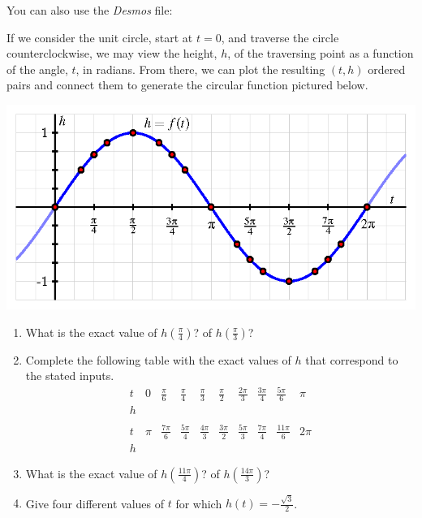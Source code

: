 \documentclass[nooutcomes]{ximera}
\begin{document}
You can also use the \emph{Desmos} file:

\begin{center}  
\end{center}

\begin{exploration}

If we consider the unit circle, start at \(t = 0\), and traverse the circle counterclockwise, we may view the height, \(h\), of the traversing point as a function of the angle, \(t\), in radians.  From there, we can plot the resulting \((t,h)\) ordered pairs and connect them to generate the circular function pictured below.

\begin{image}
\includegraphics{sine-labeling-graph.png}
\end{image}

\begin{enumerate}[label=\alph*.]
\item
What is the exact value of \(h\left( \frac{\pi}{4} \right)\)? of \(h\left( \frac{\pi}{3} \right)\)?%
\item
Complete the following table with the exact values of \(h\) that correspond to the stated inputs.%
\[
\begin{array}{llllllllll}
t&0&\frac{\pi}{6}&\frac{\pi}{4}&\frac{\pi}{3}&\frac{\pi}{2}&\frac{2\pi}{3}&\frac{3\pi}{4}&\frac{5\pi}{6}&\pi\\
\hline
h&&&&&&&&&\\
&&&&&&&&&\\
t&\pi&\frac{7\pi}{6}&\frac{5\pi}{4}&\frac{4\pi}{3}&\frac{3\pi}{2}&\frac{5\pi}{3}&\frac{7\pi}{4}&\frac{11\pi}{6}&2\pi\\
\hline
h&&&&&&&&&
\end{array}
\]
\item
What is the exact value of \(h\left( \frac{11\pi}{4} \right)\)? of \(h\left( \frac{14\pi}{3} \right)\)?%
\item
Give four different values of \(t\) for which \(h(t) = -\frac{\sqrt{3}}{2}\).%
\end{enumerate}

\end{exploration}
\end{document}
